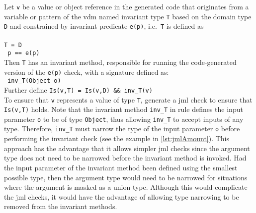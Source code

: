  { Let \texttt{v} be a
  value or object reference in the generated code that originates from
  a variable or pattern of the \ac{vdm}
  named invariant type \texttt{T} based on the domain type \texttt{D}
  and constrained
  by invariant predicate \texttt{e(p)}, i.e.\ \texttt{T} is defined as\\
  \\
  \texttt{T = D}\\
  \texttt{ p == e(p)}\\
  Then \texttt{T} has an invariant method, responsible for running the
  code-generated version of the \texttt{e(p)} check, with a signature
  defined as:\\
  \texttt{   inv\_T(Object o)}\\
  Further define
  \texttt{Is(v,T) = Is(v,D) \&\& inv\_T(v)}\\
  To ensure that \texttt{v} represents a value of type \texttt{T},
  generate a \ac{jml} check to ensure that \texttt{Is(v,T)} holds.}
%
%
Note that the invariant method \texttt{inv\_T} in rule
 defines the input parameter \texttt{o} to be of
type \texttt{Object}, thus allowing \texttt{inv\_T} to accept inputs
of any type. Therefore, \texttt{inv\_T} must narrow the type of the
input parameter \texttt{o} before performing the invariant check (see
the example in \autoref{lst:jmlAmount}). This approach has the
advantage that it allows simpler \ac{jml} checks since the argument
type does not need to be narrowed before the invariant method is
invoked. Had the input parameter of the invariant method been defined
using the smallest possible type, then the argument type would need to
be narrowed for situations where the argument is masked as a union
type. Although this would complicate the \ac{jml} checks, it would
have the advantage of allowing type narrowing to be removed from the
invariant methods.




